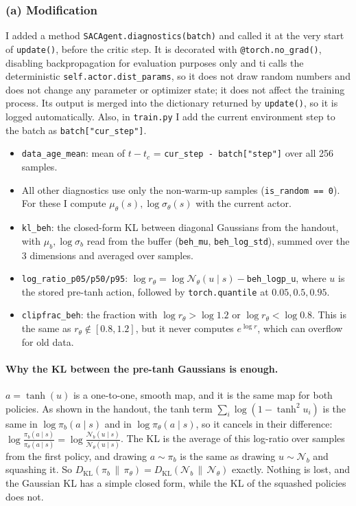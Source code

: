 \documentclass[11pt]{article}
\newcommand{\code}[1]{\texttt{#1}}
\begin{document}
\subsubsection*{(a) Modification}
I added a method \code{SACAgent.diagnostics(batch)} and called it at the very start of
\code{update()}, before the critic step. It is decorated with \code{@torch.no\_grad()}, disabling 
backpropagation for evaluation purposes only and ti calls the deterministic 
\code{self.actor.dist\_params}, so it does not draw random numbers and
does not change any parameter or optimizer state; it does not affect the training process.
Its output is merged into the dictionary returned by \code{update()}, so it is logged automatically.
Also, in \code{train.py} I add the current environment step to the batch as \code{batch["cur\_step"]}.
\begin{itemize}
  \item \code{data\_age\_mean}: mean of $t-t_c$ = \code{cur\_step - batch["step"]} over all 256 samples.
  \item All other diagnostics use only the non-warm-up samples (\code{is\_random == 0}). For these I
        compute $\mu_\theta(s),\log\sigma_\theta(s)$ with the current actor.
  \item \code{kl\_beh}: the closed-form KL between diagonal Gaussians from the handout, with
        $\mu_b,\log\sigma_b$ read from the buffer (\code{beh\_mu}, \code{beh\_log\_std}), summed over the
        3 dimensions and averaged over samples.
  \item \code{log\_ratio\_p05/p50/p95}: $\log r_\theta=\log\mathcal N_\theta(u\mid s)-$\code{beh\_logp\_u},
        where $u$ is the stored pre-tanh action, followed by \code{torch.quantile} at $0.05,0.5,0.95$.
  \item \code{clipfrac\_beh}: the fraction with $\log r_\theta>\log 1.2$ or $\log r_\theta<\log 0.8$.
        This is the same as $r_\theta\notin[0.8,1.2]$, but it never computes $e^{\log r}$, which can
        overflow for old data.
\end{itemize}

\paragraph{Why the KL between the pre-tanh Gaussians is enough.}
$a=\tanh(u)$ is a one-to-one, smooth map, and it is the same map for both policies. As shown in the
handout, the tanh term $\sum_i\log(1-\tanh^2u_i)$ is the same in $\log\pi_b(a\mid s)$ and in
$\log\pi_\theta(a\mid s)$, so it cancels in their difference:
$\log\frac{\pi_b(a\mid s)}{\pi_\theta(a\mid s)}=\log\frac{\mathcal N_b(u\mid s)}{\mathcal N_\theta(u\mid s)}$.
The KL is the average of this log-ratio over samples from the first policy, and drawing $a\sim\pi_b$ is the
same as drawing $u\sim\mathcal N_b$ and squashing it. So
$D_{\mathrm{KL}}(\pi_b\,\|\,\pi_\theta)=D_{\mathrm{KL}}(\mathcal N_b\,\|\,\mathcal N_\theta)$ exactly. Nothing is
lost, and the Gaussian KL has a simple closed form, while the KL of the squashed policies does not.
\end{document}
